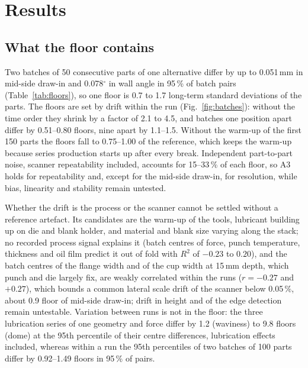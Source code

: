 \documentclass[pdflatex,sn-basic,lineno]{sn-jnl}
\begin{document}
\section{Results}\label{sec:results}

\subsection{What the floor contains}\label{sec:res-floor}

Two batches of 50 consecutive parts of one alternative differ by up to 0.051\,mm in mid-side draw-in and 0.078$^\circ$ in wall angle in 95\,\% of batch pairs (Table~\ref{tab:floors}), so one floor is 0.7 to 1.7 long-term standard deviations of the parts. The floors are set by drift within the run (Fig.~\ref{fig:batches}): without the time order they shrink by a factor of 2.1 to 4.5, and batches one position apart differ by 0.51--0.80 floors, nine apart by 1.1--1.5. Without the warm-up of the first 150 parts the floors fall to 0.75--1.00 of the reference, which keeps the warm-up because series production starts up after every break. Independent part-to-part noise, scanner repeatability included, accounts for 15--33\,\% of each floor, so A3 holds for repeatability and, except for the mid-side draw-in, for resolution, while bias, linearity and stability remain untested.

Whether the drift is the process or the scanner cannot be settled without a reference artefact. Its candidates are the warm-up of the tools, lubricant building up on die and blank holder, and material and blank size varying along the stack; no recorded process signal explains it (batch centres of force, punch temperature, thickness and oil film predict it out of fold with $R^2$ of $-0.23$ to $0.20$), and the batch centres of the flange width and of the cup width at 15\,mm depth, which punch and die largely fix, are weakly correlated within the runs ($r=-0.27$ and $+0.27$), which bounds a common lateral scale drift of the scanner below 0.05\,\%, about 0.9 floor of mid-side draw-in; drift in height and of the edge detection remain untestable. Variation between runs is not in the floor: the three lubrication series of one geometry and force differ by 1.2 (waviness) to 9.8 floors (dome) at the 95th percentile of their centre differences, lubrication effects included, whereas within a run the 95th percentiles of two batches of 100 parts differ by 0.92--1.49 floors in 95\,\% of pairs.
\end{document}
